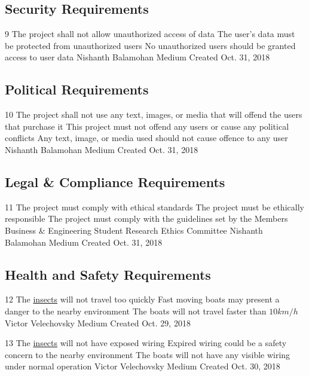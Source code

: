 \documentclass[11pt]{article}
\begin{document}
\subsection{Security Requirements}

\nonFunctionalRequirement
{9}
{The project shall not allow unauthorized access of data}
{The user's data must be protected from unauthorized users}
{No unauthorized users should be granted access to user data}
{Nishanth Balamohan}
{Medium}
{Created Oct. 31, 2018}

\subsection{Political Requirements}

\nonFunctionalRequirement
{10}
{The project shall not use any text, images, or media that will
offend the users that purchase it}
{This project must not offend any users or cause any political conflicts}
{Any text, image, or media used should not cause offence to any user}
{Nishanth Balamohan}
{Medium}
{Created Oct. 31, 2018}

\subsection{Legal \& Compliance Requirements}

\nonFunctionalRequirement
{11}
{The project must comply with ethical standards}
{The project must be ethically responsible}
{The project must comply with the guidelines set by the Members Business \& Engineering Student Research Ethics Committee}
{Nishanth Balamohan}
{Medium}
{Created Oct. 31, 2018}

\subsection{Health and Safety Requirements}

\nonFunctionalRequirement
{12}
{The \hyperref[sec:definitions]{insects} will not travel too quickly}
{Fast moving boats may present a danger to the nearby environment}
{The boats will not travel faster than $10 km/h$}
{Victor Velechovsky}
{Medium}
{Created Oct. 29, 2018}

\nonFunctionalRequirement
{13}
{The \hyperref[sec:definitions]{insects} will not have exposed wiring}
{Expired wiring could be a safety concern to the nearby environment}
{The boats will not have any visible wiring under normal operation}
{Victor Velechovsky}
{Medium}
{Created Oct. 30, 2018}
\end{document}
